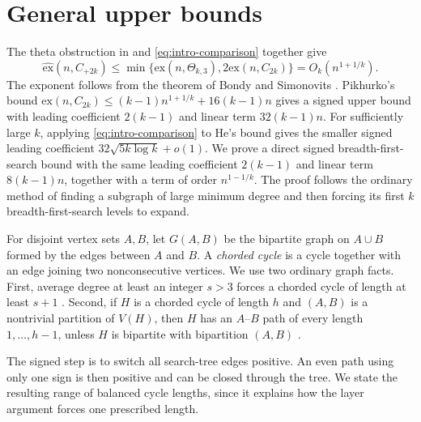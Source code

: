 \documentclass{article}
\newcommand{\ex}{\mathrm{ex}}
\newcommand{\hex}{\widehat{\ex}}
\theoremstyle{definition}
\theoremstyle{remark}
\begin{document}
\section{General upper bounds}\label{sec:signed-BFS}

The theta obstruction in  and
\eqref{eq:intro-comparison} together give
\[
\hex(n,C_{+2k})\leq
\min\{\ex(n,\Theta_{k,3}),2\ex(n,C_{2k})\}=O_k(n^{1+1/k}).
\]
The exponent follows from the theorem of Bondy and Simonovits
\cite{BondySimonovits74}.  Pikhurko's bound
$\ex(n,C_{2k})\leq(k-1)n^{1+1/k}+16(k-1)n$ \cite{Pikhurko2012} gives
a signed upper bound with leading coefficient $2(k-1)$ and linear term
$32(k-1)n$.  For sufficiently large $k$, applying
\eqref{eq:intro-comparison} to He's bound \cite{He2021} gives the smaller
signed leading coefficient $32\sqrt{5k\log k}+o(1)$.
We prove a direct signed breadth-first-search
bound with the same leading coefficient $2(k-1)$ and linear term
$8(k-1)n$, together with a term of order $n^{1-1/k}$.  The proof follows
the ordinary method of finding a subgraph of large minimum degree and then
forcing its first $k$ breadth-first-search levels to expand.

For disjoint vertex sets $A,B$, let $G(A,B)$ be the bipartite graph on
$A\cup B$ formed by the edges between $A$ and $B$.  A \emph{chorded cycle} is a cycle together with
an edge joining two nonconsecutive vertices.  We use two ordinary graph
facts.  First, average degree at least an integer $s>3$ forces a chorded
cycle of length at least $s+1$ \cite[Proposition~3.2]{Verstraete2016}.
Second, if $H$ is a chorded cycle of length $h$ and $(A,B)$ is a nontrivial
partition of $V(H)$, then $H$ has an $A$--$B$ path of every length
$1,\ldots,h-1$, unless $H$ is bipartite with bipartition $(A,B)$
\cite[Lemma~2]{Verstraete2000}.

The signed step is to switch all search-tree edges positive.  An even
path using only one sign is then positive and can be closed through the
tree.  We state the resulting range of balanced cycle lengths, since it
explains how the layer argument forces one prescribed length.
\end{document}
